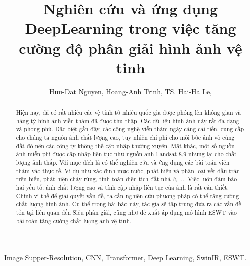\documentclass[conference]{IEEEtran}
\begin{document}
\title{Nghiên cứu và ứng dụng DeepLearning trong việc tăng cường độ phân giải hình ảnh vệ tinh\\

}
\author{\IEEEauthorblockN
{
Huu-Dat Nguyen,
Hoang-Anh Trinh,
TS. Hai-Ha Le,
}
}

\maketitle

\begin{abstract}
Hiện nay, đã có rất nhiều các vệ tinh từ nhiều quốc gia được phóng lên không gian và hàng tỷ hình ảnh viễn thám đã được thu thập. Các dữ liệu hình ảnh này rất đa dạng và phong phú. Đặc biệt gần đây, các công nghệ viễn thám ngày càng cải tiến, cung cấp cho chúng ta nguồn ảnh chất lượng cao, tuy nhiên chi phí cho mỗi bức ảnh vô cùng đắt đỏ nên các công ty không thể cập nhập thường xuyên. Mặt khác, một số nguồn ảnh miễn phí được cập nhập liên tục như nguồn ảnh Landsat-8,9 nhưng lại cho chất lượng ảnh thấp. Với mục đích là có thể nghiên cứu và ứng dụng các bài toán viễn thám vào thực tế. Ví dụ như xác định mực nước, phát hiện và phân loại vết dầu tràn trên biển, phát hiện cháy rừng, tính toán diện tích đất nhà ở, .... Việc luôn đảm bảo hai yếu tố: ảnh chất lượng cao và tính cập nhập liên tục của ảnh là rất cần thiết. Chính vì thế để giải quyết vấn đề, ta cần nghiên cứu phương pháp có thể tăng cường chất lượng hình ảnh. Cụ thể trong bài báo này, tác giả sẽ tập trung đưa ra các vấn đề tồn tại liên quan đến Siêu phân giải, cũng như đề xuất áp dụng mô hình ESWT vào bài toán tăng cường chất lượng ảnh vệ tinh.
\end{abstract}

\begin{IEEEkeywords}
Image Supper-Resolution, CNN, Transformer, Deep Learning, SwinIR, ESWT.
\end{IEEEkeywords}
\end{document}
